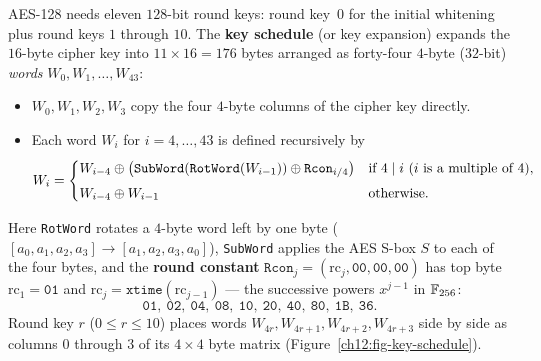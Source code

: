 AES-128 needs eleven $128$-bit round keys: round key~$0$ for the initial whitening
plus round keys $1$ through $10$. The \textbf{key schedule} (or key expansion)
expands the $16$-byte cipher key into $11 \times 16 = 176$ bytes arranged as
forty-four $4$-byte ($32$-bit) \emph{words} $W_0, W_1, \dots, W_{43}$:

\begin{itemize}
\item $W_0, W_1, W_2, W_3$ copy the four $4$-byte columns of the cipher key directly.
\item Each word $W_i$ for $i = 4,\dots,43$ is defined recursively by
\[
W_i =
\begin{cases}
W_{i-4} \oplus \bigl(\texttt{SubWord}(\texttt{RotWord}(W_{i-1})) \oplus \texttt{Rcon}_{i/4}\bigr)
& \text{if } 4 \mid i \text{ ($i$ is a multiple of $4$),}\\[4pt]
W_{i-4} \oplus W_{i-1} & \text{otherwise.}
\end{cases}
\]
\end{itemize}

Here \texttt{RotWord} rotates a $4$-byte word left by one byte
($[a_0,a_1,a_2,a_3] \to [a_1,a_2,a_3,a_0]$), \texttt{SubWord} applies the AES
S-box $S$ to each of the four bytes, and the \textbf{round constant}
$\texttt{Rcon}_j = (\mathrm{rc}_j, \mathtt{00}, \mathtt{00}, \mathtt{00})$ has top
byte $\mathrm{rc}_1 = \mathtt{01}$ and $\mathrm{rc}_j = \texttt{xtime}(\mathrm{rc}_{j-1})$
--- the successive powers $x^{j-1}$ in $\mathbb{F}_{256}$:
\[
\mathtt{01},\ \mathtt{02},\ \mathtt{04},\ \mathtt{08},\ \mathtt{10},\
\mathtt{20},\ \mathtt{40},\ \mathtt{80},\ \mathtt{1B},\ \mathtt{36}.
\]
Round key $r$ ($0 \le r \le 10$) places words $W_{4r}, W_{4r+1}, W_{4r+2}, W_{4r+3}$
side by side as columns $0$ through $3$ of its $4\times 4$ byte matrix
(Figure~\ref{ch12:fig-key-schedule}).

